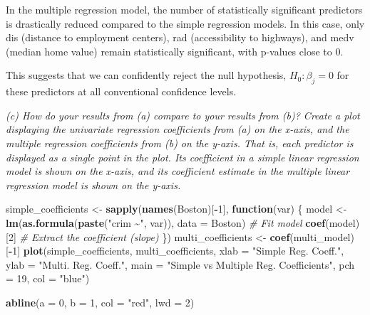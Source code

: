 \documentclass[
]{article}
\newenvironment{Shaded}{\begin{snugshade}}{\end{snugshade}}
\newcommand{\AttributeTok}[1]{\textcolor[rgb]{0.13,0.29,0.53}{#1}}
\newcommand{\CommentTok}[1]{\textcolor[rgb]{0.56,0.35,0.01}{\textit{#1}}}
\newcommand{\ControlFlowTok}[1]{\textcolor[rgb]{0.13,0.29,0.53}{\textbf{#1}}}
\newcommand{\DecValTok}[1]{\textcolor[rgb]{0.00,0.00,0.81}{#1}}
\newcommand{\FunctionTok}[1]{\textcolor[rgb]{0.13,0.29,0.53}{\textbf{#1}}}
\newcommand{\NormalTok}[1]{#1}
\newcommand{\OtherTok}[1]{\textcolor[rgb]{0.56,0.35,0.01}{#1}}
\newcommand{\SpecialCharTok}[1]{\textcolor[rgb]{0.81,0.36,0.00}{\textbf{#1}}}
\newcommand{\StringTok}[1]{\textcolor[rgb]{0.31,0.60,0.02}{#1}}
\begin{document}
In the multiple regression model, the number of statistically
significant predictors is drastically reduced compared to the simple
regression models. In this case, only dis (distance to employment
centers), rad (accessibility to highways), and medv (median home value)
remain statistically significant, with p-values close to 0.

This suggests that we can confidently reject the null hypothesis,
\(H_0 : \beta_j = 0\) for these predictors at all conventional
confidence levels.

\emph{(c) How do your results from (a) compare to your results from (b)?
Create a plot displaying the univariate regression coefficients from (a)
on the x-axis, and the multiple regression coefficients from (b) on the
y-axis. That is, each predictor is displayed as a single point in the
plot. Its coefficient in a simple linear regression model is shown on
the x-axis, and its coefficient estimate in the multiple linear
regression model is shown on the y-axis.}

\begin{Shaded}
\begin{Highlighting}[]
\NormalTok{simple\_coefficients }\OtherTok{\textless{}{-}} \FunctionTok{sapply}\NormalTok{(}\FunctionTok{names}\NormalTok{(Boston)[}\SpecialCharTok{{-}}\DecValTok{1}\NormalTok{], }\ControlFlowTok{function}\NormalTok{(var) \{}
\NormalTok{  model }\OtherTok{\textless{}{-}} \FunctionTok{lm}\NormalTok{(}\FunctionTok{as.formula}\NormalTok{(}\FunctionTok{paste}\NormalTok{(}\StringTok{"crim \textasciitilde{}"}\NormalTok{, var)), }\AttributeTok{data =}\NormalTok{ Boston)  }\CommentTok{\# Fit model}
  \FunctionTok{coef}\NormalTok{(model)[}\DecValTok{2}\NormalTok{]  }\CommentTok{\# Extract the coefficient (slope)}
\NormalTok{\})}
\NormalTok{multi\_coefficients }\OtherTok{\textless{}{-}} \FunctionTok{coef}\NormalTok{(multi\_model)[}\SpecialCharTok{{-}}\DecValTok{1}\NormalTok{] }
\FunctionTok{plot}\NormalTok{(simple\_coefficients, multi\_coefficients, }
     \AttributeTok{xlab =} \StringTok{"Simple Reg. Coeff."}\NormalTok{, }
     \AttributeTok{ylab =} \StringTok{"Multi. Reg. Coeff."}\NormalTok{, }
     \AttributeTok{main =} \StringTok{"Simple vs Multiple Reg. Coefficients"}\NormalTok{, }
     \AttributeTok{pch =} \DecValTok{19}\NormalTok{, }\AttributeTok{col =} \StringTok{"blue"}\NormalTok{)}

\FunctionTok{abline}\NormalTok{(}\AttributeTok{a =} \DecValTok{0}\NormalTok{, }\AttributeTok{b =} \DecValTok{1}\NormalTok{, }\AttributeTok{col =} \StringTok{"red"}\NormalTok{, }\AttributeTok{lwd =} \DecValTok{2}\NormalTok{) }
\end{Highlighting}
\end{Shaded}
\end{document}
